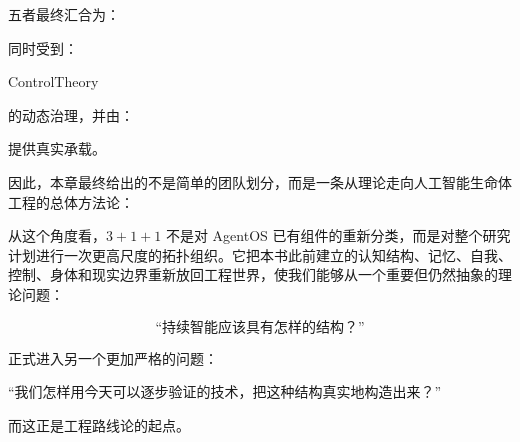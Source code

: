 五者最终汇合为：
\begin{statementbox}
\centering
{}
\end{statementbox}
同时受到：
\begin{statementbox}
ControlTheory
\end{statementbox}
的动态治理，并由：
\begin{statementbox}
\centering
{}
\end{statementbox}
提供真实承载。

因此，本章最终给出的不是简单的团队划分，而是一条从理论走向人工智能生命体工程的总体方法论：

\begin{statementbox}
\centering
{}
\end{statementbox}

从这个角度看，$3+1+1$ 不是对 AgentOS 已有组件的重新分类，而是对整个研究计划进行一次更高尺度的拓扑组织。它把本书此前建立的认知结构、记忆、自我、控制、身体和现实边界重新放回工程世界，使我们能够从一个重要但仍然抽象的理论问题：

\[
\text{``持续智能应该具有怎样的结构？''}
\]

正式进入另一个更加严格的问题：

\begin{statementbox}
``我们怎样用今天可以逐步验证的技术，把这种结构真实地构造出来？''
\end{statementbox}

而这正是工程路线论的起点。
